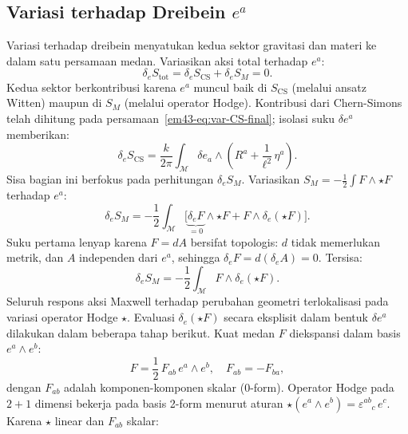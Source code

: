 \subsection{Variasi terhadap Dreibein $e^{a}$}
\label{em43-sec:vare}

Variasi terhadap dreibein menyatukan kedua sektor gravitasi dan materi ke dalam satu persamaan medan. Variasikan aksi total terhadap $e^{a}$:
\begin{equation}\label{em43-eq:vare-total}
    \delta_{e} S_{\mathrm{tot}}
    = \delta_{e} S_{\mathrm{CS}}
    + \delta_{e} S_{M} = 0.
\end{equation}
Kedua sektor berkontribusi karena $e^{a}$ muncul baik di $S_{\mathrm{CS}}$ (melalui ansatz Witten) maupun di $S_{M}$ (melalui operator Hodge). Kontribusi dari Chern-Simons telah dihitung pada persamaan~\eqref{em43-eq:var-CS-final}; isolasi suku $\delta e^{a}$ memberikan:
\begin{equation}\label{em43-eq:var-e-CS}
    \delta_{e} S_{\mathrm{CS}}
    = \frac{k}{2\pi} \int_{\mathcal{M}}
    \delta e_{a} \wedge \left(R^{a}
    + \frac{1}{\ell^{2}}\, \eta^{a}\right).
\end{equation}
Sisa bagian ini berfokus pada perhitungan $\delta_{e} S_{M}$.
Variasikan $S_{M} = -\frac{1}{2}\int F \wedge \star F$ terhadap $e^{a}$:
\begin{equation}\label{em43-eq:var-e-SM-awal}
    \delta_{e} S_{M}
    = -\frac{1}{2} \int_{\mathcal{M}}
    \Big[\underbrace{\delta_{e} F}_{= 0} \wedge \star F
    + F \wedge \delta_{e}(\star F)\Big].
\end{equation}
Suku pertama lenyap karena $F = dA$ bersifat topologis: $d$ tidak memerlukan metrik, dan $A$ independen dari $e^{a}$, sehingga $\delta_{e} F = d(\delta_{e} A) = 0$. Tersisa:
\begin{equation}\label{em43-eq:var-e-SM-reduced}
    \delta_{e} S_{M}
    = -\frac{1}{2} \int_{\mathcal{M}} F \wedge \delta_{e}(\star F).
\end{equation}
Seluruh respons aksi Maxwell terhadap perubahan geometri terlokalisasi pada variasi operator Hodge $\star$. Evaluasi $\delta_{e}(\star F)$ secara eksplisit dalam bentuk $\delta e^{a}$ dilakukan dalam beberapa tahap berikut.
Kuat medan $F$ diekspansi dalam basis $e^{a} \wedge e^{b}$:
\begin{equation}\label{em43-eq:F-ekspansi}
    F = \frac{1}{2}\, F_{ab}\, e^{a} \wedge e^{b},
    \quad F_{ab} = -F_{ba},
\end{equation}
dengan $F_{ab}$ adalah komponen-komponen skalar (0-form). Operator Hodge pada $2+1$ dimensi bekerja pada basis 2-form menurut aturan $\star(e^{a} \wedge e^{b}) = \varepsilon^{ab}{}_{c}\, e^{c}$. Karena $\star$ linear dan $F_{ab}$ skalar:
